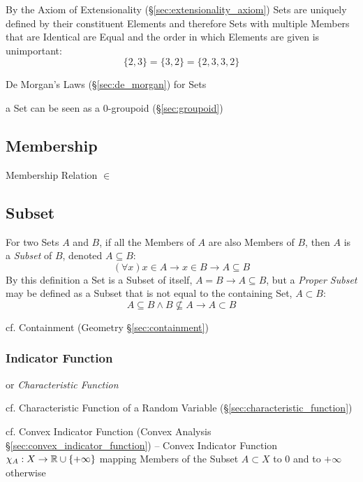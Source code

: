 By the Axiom of Extensionality (\S\ref{sec:extensionality_axiom}) Sets
are uniquely defined by their constituent Elements and therefore Sets
with multiple Members that are Identical are Equal and the order in
which Elements are given is unimportant:
\[
  \{ 2, 3 \} = \{ 3, 2 \} = \{ 2, 3, 3, 2 \}
\]

De Morgan's Laws (\S\ref{sec:de_morgan}) for Sets

a Set can be seen as a $0$-groupoid (\S\ref{sec:groupoid})



\subsection{Membership}\label{sec:membership}

Membership Relation $\in$



\subsection{Subset}\label{sec:subset}

For two Sets $A$ and $B$, if all the Members of $A$ are also Members
of $B$, then $A$ is a \emph{Subset} of $B$, denoted $A \subseteq B$:
\[
  (\forall x) x \in A \to x \in B \to A \subseteq B
\]
By this definition a Set is a Subset of itself, $A = B \to A
\subseteq B$, but a \emph{Proper Subset} may be defined as a Subset
that is not equal to the containing Set, $A \subset B$:
\[
  A \subseteq B \wedge B \nsubseteq A \to A \subset B
\]

\fist cf. Containment (Geometry \S\ref{sec:containment})



\subsubsection{Indicator Function}\label{sec:indicator_function}

or \emph{Characteristic Function}

\fist cf. Characteristic Function of a Random Variable
(\S\ref{sec:characteristic_function})

\fist cf. Convex Indicator Function (Convex Analysis
\S\ref{sec:convex_indicator_function}) -- Convex Indicator Function
$\chi_A : X \to \mathbb{R} \cup \{ +\infty \}$ mapping Members of the
Subset $A \subset X$ to $0$ and to $+\infty$ otherwise

